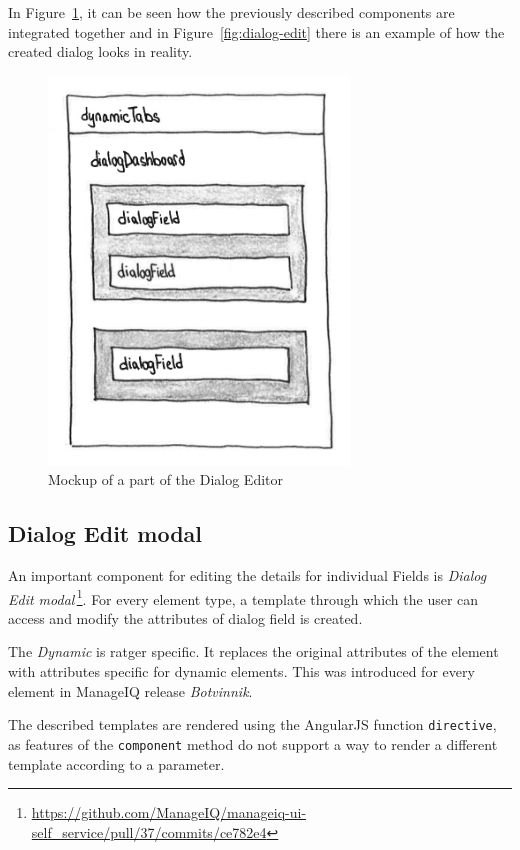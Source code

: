 In Figure~\ref{fig:dialog-mockup}, it can be seen how the previously described
components are integrated together and in Figure~\ref{fig:dialog-edit} there
is an example of how the created dialog looks in reality.

\begin{figure}
  \centering
  \def\svgwidth{\columnwidth}
  \includegraphics[width=8cm,keepaspectratio]{fig/dialog-mockup}
  \caption{Mockup of a part of the Dialog Editor}\label{fig:dialog-mockup}
\end{figure}

\subsection{Dialog Edit modal}

An important component for editing the details for individual Fields is
{\it Dialog Edit modal}\,\footnote{\url{https://github.com/ManageIQ/manageiq-ui-self_service/pull/37/commits/ce782e4}}.
For every element type, a template through which the user can access
and modify the attributes of dialog field is created.

The {\it Dynamic} is ratger specific. It replaces the original attributes
of the element with attributes specific for dynamic elements. This was
introduced for every element in ManageIQ release {\it Botvinnik}.

The described templates are rendered using the AngularJS function
{\tt directive}, as features of the {\tt component} method do not support
a way to render a different template according to a parameter.


